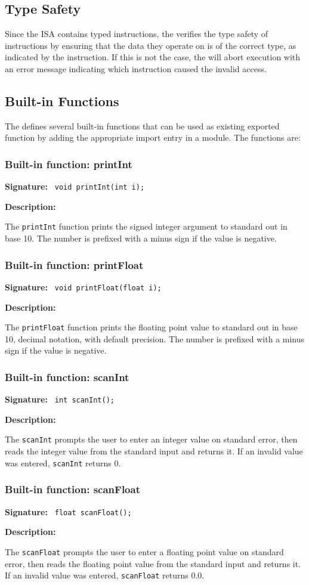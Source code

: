 \subsection{Type Safety}

Since the ISA contains typed instructions, the \civicvm{} verifies the type safety of instructions by ensuring that the data they operate on is of the correct type, as indicated by the instruction. If this is not the case, the \civicvm{} will abort execution with an error message indicating which instruction caused the invalid access.

\subsection{Built-in Functions}

The \civicvm{} defines several built-in functions that can be used as existing exported function by adding the appropriate import entry in a module. The functions are:

\newenvironment{builtin}[2] {
    \subsubsection{Built-in function: #1}
    {\bfseries Signature:} \texttt{#2} \par
    \textbf{Description:} 
}{
}

\begin{builtin}{printInt}{
    void printInt(int i);
}
The \texttt{printInt} function prints the signed integer argument to standard out in base 10. The number is prefixed with a minus sign if the value is negative.
\end{builtin}

\begin{builtin}{printFloat}{
    void printFloat(float i);
}
The \texttt{printFloat} function prints the floating point value to standard out in base 10, decimal notation, with default precision. The number is prefixed with a minus sign if the value is negative.
\end{builtin}

\begin{builtin}{scanInt}{
    int scanInt();
}
The \texttt{scanInt} prompts the user to enter an integer value on standard error, then reads the integer value from the standard input and returns it. If an invalid value was entered, \texttt{scanInt} returns 0.
\end{builtin}

\begin{builtin}{scanFloat}{
    float scanFloat();
}
The \texttt{scanFloat} prompts the user to enter a floating point value on standard error, then reads the floating point value from the standard input and returns it. If an invalid value was entered, \texttt{scanFloat} returns 0.0.
\end{builtin}
